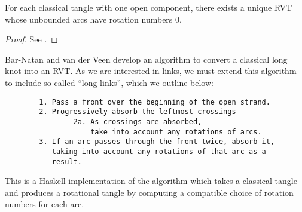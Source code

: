 \begin{lemma}
        For each classical tangle with one open component, there exists a unique
        \ac{RVT} whose unbounded arcs have rotation numbers $0$.
\end{lemma}
\begin{proof}
        See \cite{BV}.
\end{proof}

Bar-Natan and van der Veen develop an algorithm to convert a classical long knot
into an \ac{RVT}. As we are interested in links, we must extend this algorithm
to include so-called \enquote{long links}, which we outline below:
\begin{verbatim}
        1. Pass a front over the beginning of the open strand.
        2. Progressively absorb the leftmost crossings
                2a. As crossings are absorbed,
                    take into account any rotations of arcs.
        3. If an arc passes through the front twice, absorb it,
           taking into account any rotations of that arc as a
           result.
\end{verbatim}



This is a Haskell implementation of the algorithm  which takes a
classical tangle and produces a rotational tangle by computing a compatible
choice of rotation numbers for each arc.


